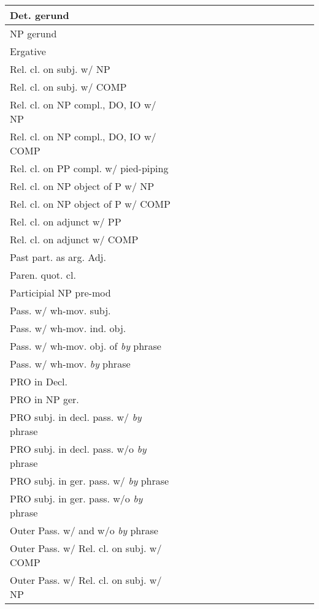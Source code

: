 \begin{center}
\begin{tabular}{|p{2.4in}||*{14}{c|}}
\hline
Det. gerund & & & & & & & & & & & & & & \\
\hline
NP gerund & & & & & & & & & & & & & & \\
\hline
Ergative & & & & & & & & & & & & & & \\
\hline
Rel. cl. on subj. w/ NP & & & & & & & & & & & & & & \\
\hline
Rel. cl. on subj. w/ COMP & & & & & & & & & & & & & & \\
\hline
Rel. cl. on NP compl., DO, IO w/ NP & & & & & & & & & & & & & & \\
\hline
Rel. cl. on NP compl., DO, IO w/ COMP & & & & & & & & & & & & & & \\
\hline
Rel. cl. on PP compl. w/ pied-piping & & & & & & & & & & & & & & \\
\hline
Rel. cl. on NP object of P w/ NP & & & & & & & & & & & & & & \\
\hline
Rel. cl. on NP object of P w/ COMP & & & & & & & & & & & & & & \\
\hline
Rel. cl. on adjunct w/ PP & & & & & & & & & & & & & & \\
\hline
Rel. cl. on adjunct w/ COMP & & & & & & & & & & & & & & \\
\hline
Past part. as arg. Adj. & & & & & & & & & & & & & & \\
\hline
Paren. quot. cl. & & & & & & & & & & & & & & \\
\hline
Participial NP pre-mod & & & & & & & & & & & & & & \\
\hline
Pass. w/ wh-mov. subj. & & & & & & & & & & & & & & \\
\hline
Pass. w/ wh-mov. ind. obj. & & & & & & & & & & & & & & \\
\hline
Pass. w/ wh-mov. obj. of  {\it by} phrase & & & & & & & & & & & & & & \\
\hline
Pass. w/ wh-mov. {\it by} phrase & & & & & & & & & & & & & & \\
\hline
PRO in Decl. & & & & & & & & & & & & & & \\
\hline
PRO in NP ger. & & & & & & & & & & & & & & \\
\hline
PRO subj. in decl. pass. w/ {\it by} phrase & & & & & & & & & & & & & & \\
\hline
PRO subj. in decl. pass. w/o {\it by} phrase & & & & & & & & & & & & & & \\
\hline
PRO subj. in ger. pass. w/ {\it by} phrase & & & & & & & & & & & & & & \\
\hline
PRO subj. in ger. pass. w/o {\it by} phrase & & & & & & & & & & & & & & \\
\hline
Outer Pass. w/ and w/o {\it by} phrase & & & & & & & & & & & & & & \\
\hline
Outer Pass. w/ Rel. cl. on subj. w/ COMP & & & & & & & & & & & & & & \\
\hline
Outer Pass. w/ Rel. cl. on subj. w/ NP & & & & & & & & & & & & & & \\
\hline
\end{tabular}
\end{center}
